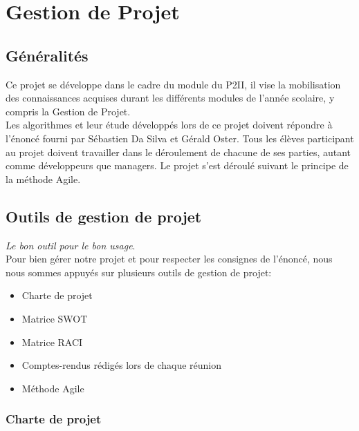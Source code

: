 
   \chapter{Gestion de Projet}
   \minitoc
      \section{Généralités}
      Ce projet se développe dans le cadre du module du P2II, il vise la mobilisation des connaissances acquises durant les différents modules de l'année scolaire, y compris la Gestion de Projet. \\
      
      Les algorithmes et leur étude développés lors de ce projet doivent répondre à l’énoncé fourni par Sébastien Da Silva et Gérald Oster. Tous les élèves participant au projet doivent travailler dans le déroulement de chacune de ses parties, autant comme développeurs que managers. Le projet s'est déroulé suivant le principe de la méthode Agile.\\


      \section{Outils de gestion de projet}
      \textit{Le bon outil pour le bon usage}.\\
      
      Pour bien gérer notre projet et pour respecter les consignes de l'énoncé, nous nous sommes appuyés sur plusieurs outils de gestion de projet:\\
      
      \begin{itemize}
         \item Charte de projet 
         \item Matrice SWOT
         \item Matrice RACI 
         \item Comptes-rendus rédigés lors de chaque réunion 
         \item Méthode Agile
      \end{itemize}
      
         \subsection{Charte de projet}
            
